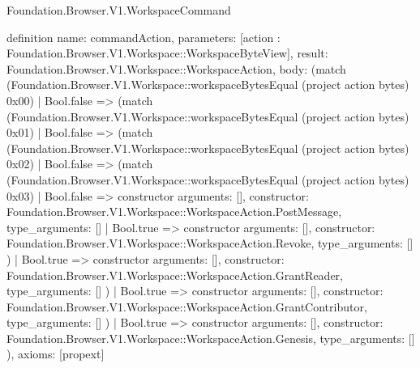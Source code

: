 \begin{lexlean}{Foundation.Browser.V1.WorkspaceCommand}
\begin{semanticmodule}
definition{
  name: commandAction,
  parameters: [action : Foundation.Browser.V1.Workspace::WorkspaceByteView],
  result: Foundation.Browser.V1.Workspace::WorkspaceAction,
  body: (match (Foundation.Browser.V1.Workspace::workspaceBytesEqual (project action bytes) 0x00)
    | Bool.false => (match (Foundation.Browser.V1.Workspace::workspaceBytesEqual (project action bytes) 0x01)
      | Bool.false => (match (Foundation.Browser.V1.Workspace::workspaceBytesEqual (project action bytes) 0x02)
        | Bool.false => (match (Foundation.Browser.V1.Workspace::workspaceBytesEqual (project action bytes) 0x03)
          | Bool.false => constructor{
            arguments: [],
            constructor: Foundation.Browser.V1.Workspace::WorkspaceAction.PostMessage,
            type_arguments: []
          }
          | Bool.true => constructor{
            arguments: [],
            constructor: Foundation.Browser.V1.Workspace::WorkspaceAction.Revoke,
            type_arguments: []
          })
        | Bool.true => constructor{
          arguments: [],
          constructor: Foundation.Browser.V1.Workspace::WorkspaceAction.GrantReader,
          type_arguments: []
        })
      | Bool.true => constructor{
        arguments: [],
        constructor: Foundation.Browser.V1.Workspace::WorkspaceAction.GrantContributor,
        type_arguments: []
      })
    | Bool.true => constructor{
      arguments: [],
      constructor: Foundation.Browser.V1.Workspace::WorkspaceAction.Genesis,
      type_arguments: []
    }),
  axioms: [propext]
}


\end{semanticmodule}
\end{lexlean}
